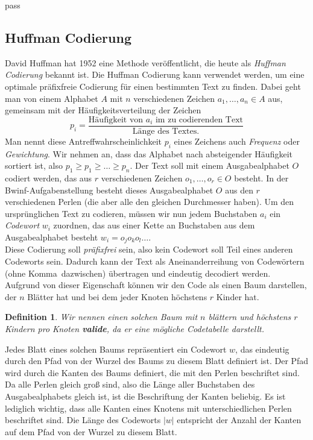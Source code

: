 pass\documentclass[a4paper,10pt,ngerman]{scrartcl}
\newtheorem{definition}[satz]{Definition}
\begin{document}
    \subsection{Huffman Codierung}
    David Huffman hat 1952 eine Methode veröffentlicht, die heute als \textit{Huffman Codierung} bekannt ist\autocite{noauthor_huffman-kodierung_2025}.
    Die Huffman Codierung kann verwendet werden, um eine optimale präfixfreie Codierung für einen bestimmten Text zu finden.
    Dabei geht man von einem Alphabet $A$ mit $n$ verschiedenen Zeichen $a_1, \dots, a_n \in A$ aus, gemeinsam mit der Häufigkeitsverteilung der Zeichen \[p_i = \frac {\text{Häufigkeit von $a_i$ im zu codierenden Text}} {\text{Länge des Textes.}}\]
    Man nennt diese Antreffwahrscheinlichkeit $p_i$ eines Zeichens auch \textit{Frequenz} oder \textit{Gewichtung}.
    Wir nehmen an, dass das Alphabet nach absteigender Häufigkeit sortiert ist, also $p_1 \ge p_1 \ge \dots \ge p_n$.
    Der Text soll mit einem Ausgabealphabet $O$ codiert werden, das aus $r$ verschiedenen Zeichen $o_1, \dots, o_r \in O$ besteht.
    In der Bwinf-Aufgabenstellung besteht dieses Ausgabealphabet $O$ aus den $r$ verschiedenen Perlen (die aber alle den gleichen Durchmesser haben). Um den ursprünglichen Text zu codieren, müssen wir nun jedem Buchstaben $a_i$ ein \textit{Codewort} $w_i$ zuordnen, das aus einer Kette an Buchstaben aus dem Ausgabealphabet besteht $w_i = o_j o_k o_l \dots$. \\
    Diese Codierung soll \textit{präfixfrei} sein, also kein Codewort soll Teil eines anderen Codeworts sein.
    Dadurch kann der Text als Aneinanderreihung von Codewörtern (ohne \glqq Komma\grqq~dazwischen) übertragen und eindeutig decodiert werden. \\
    Aufgrund von dieser Eigenschaft können wir den Code als einen Baum darstellen, der $n$ Blätter hat und bei dem jeder Knoten höchstens $r$ Kinder hat.
    \begin{definition}
        Wir nennen einen solchen Baum mit $n$ blättern und höchstens $r$ Kindern pro Knoten \textbf{valide}, da er eine mögliche Codetabelle darstellt.
    \end{definition}
    Jedes Blatt eines solchen Baums repräsentiert ein Codewort $w$, das eindeutig durch den Pfad von der Wurzel des Baums zu diesem Blatt definiert ist. Der Pfad wird durch die Kanten des Baums definiert, die mit den Perlen beschriftet sind. Da alle Perlen gleich groß sind, also die Länge aller Buchstaben des Ausgabealphabets gleich ist, ist die Beschriftung der Kanten beliebig. Es ist lediglich wichtig, dass alle Kanten eines Knotens mit unterschiedlichen Perlen beschriftet sind. Die Länge des Codeworts $|w|$ entspricht der Anzahl der Kanten auf dem Pfad von der Wurzel zu diesem Blatt. \\
\end{document}

